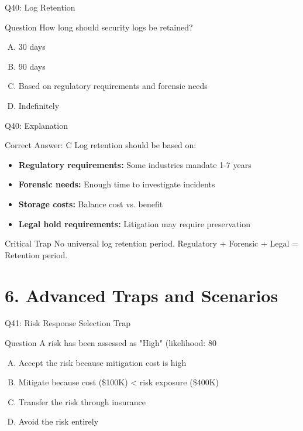 \documentclass{beamer}
\begin{document}
	\begin{frame}{Q40: Log Retention}
		\begin{block}{Question}
			How long should security logs be retained?
		\end{block}
		\begin{enumerate}[(A)]
			\item 30 days
			\item 90 days
			\item Based on regulatory requirements and forensic needs
			\item Indefinitely
		\end{enumerate}
	\end{frame}
	
	\begin{frame}{Q40: Explanation}
		\begin{block}{Correct Answer: C}
			Log retention should be based on:
			\begin{itemize}
				\item \textbf{Regulatory requirements:} Some industries mandate 1-7 years
				\item \textbf{Forensic needs:} Enough time to investigate incidents
				\item \textbf{Storage costs:} Balance cost vs. benefit
				\item \textbf{Legal hold requirements:} Litigation may require preservation
			\end{itemize}
		\end{block}
		\begin{alertblock}{Critical Trap}
			No universal log retention period.
			Regulatory + Forensic + Legal = Retention period.
		\end{alertblock}
	\end{frame}
	
	
	\section{6. Advanced Traps and Scenarios}
	
	\begin{frame}{Q41: Risk Response Selection Trap}
		\begin{block}{Question}
			A risk has been assessed as "High" (likelihood: 80%
		\end{block}
		\begin{enumerate}[(A)]
			\item Accept the risk because mitigation cost is high
			\item Mitigate because cost (\$100K) < risk exposure (\$400K)
			\item Transfer the risk through insurance
			\item Avoid the risk entirely
		\end{enumerate}
	\end{frame}
	
\end{document}
